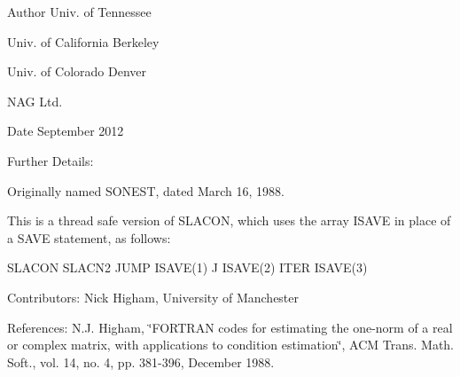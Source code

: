 \begin{DoxyAuthor}{Author}
Univ. of Tennessee 

Univ. of California Berkeley 

Univ. of Colorado Denver 

N\+A\+G Ltd. 
\end{DoxyAuthor}
\begin{DoxyDate}{Date}
September 2012 
\end{DoxyDate}
\begin{DoxyParagraph}{Further Details\+: }
\begin{DoxyVerb}  Originally named SONEST, dated March 16, 1988.

  This is a thread safe version of SLACON, which uses the array ISAVE
  in place of a SAVE statement, as follows:

     SLACON     SLACN2
      JUMP     ISAVE(1)
      J        ISAVE(2)
      ITER     ISAVE(3)\end{DoxyVerb}
 
\end{DoxyParagraph}
\begin{DoxyParagraph}{Contributors\+: }
Nick Higham, University of Manchester 
\end{DoxyParagraph}
\begin{DoxyParagraph}{References\+: }
N.\+J. Higham, \char`\"{}\+F\+O\+R\+T\+R\+A\+N codes for estimating the one-\/norm of
  a real or complex matrix, with applications to condition estimation\char`\"{}, A\+C\+M Trans. Math. Soft., vol. 14, no. 4, pp. 381-\/396, December 1988. 
\end{DoxyParagraph}
